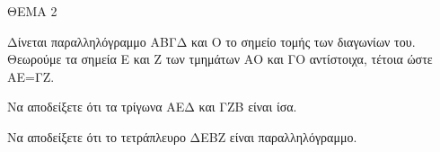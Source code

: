 
ΘΕΜΑ 2

Δίνεται παραλληλόγραμμο ΑΒΓΔ και Ο το σημείο τομής των διαγωνίων του. Θεωρούμε τα σημεία Ε και Ζ των τμημάτων ΑΟ και ΓΟ αντίστοιχα, τέτοια ώστε ΑΕ=ΓΖ.

\begin{alist}
\item Να αποδείξετε ότι τα τρίγωνα ΑΕΔ και ΓΖΒ είναι ίσα. 

\item Να αποδείξετε ότι το τετράπλευρο ΔΕΒΖ είναι παραλληλόγραμμο. 
\end{alist}
